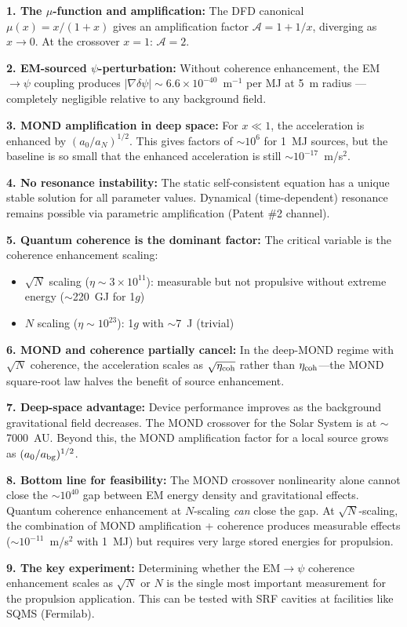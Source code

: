 \documentclass[aps,prd,twocolumn,superscriptaddress,nofootinbib]{revtex4-2}
\newcommand{\ee}[1]{\times 10^{#1}}
\begin{document}
\begin{tcolorbox}[colback=blue!5!white, colframe=blue!75!black,
title=Agent 11: Principal Findings]

\textbf{1. The $\mu$-function and amplification:}
The DFD canonical $\mu(x) = x/(1+x)$ gives an amplification factor
$\mathcal{A} = 1 + 1/x$, diverging as $x \to 0$.  At the crossover
$x = 1$: $\mathcal{A} = 2$.

\textbf{2. EM-sourced $\psi$-perturbation:}
Without coherence enhancement, the EM$\to\psi$ coupling produces
$|\nabla\delta\psi| \sim 6.6\ee{-40}$~m$^{-1}$ per MJ at 5~m radius
---completely negligible relative to any background field.

\textbf{3. MOND amplification in deep space:}
For $x \ll 1$, the acceleration is enhanced by $(a_0/a_N)^{1/2}$.
This gives factors of $\sim 10^6$ for 1~MJ sources, but the baseline
is so small that the enhanced acceleration is still $\sim 10^{-17}$~m/s$^2$.

\textbf{4. No resonance instability:}
The static self-consistent equation has a unique stable solution for all
parameter values.  Dynamical (time-dependent) resonance remains possible
via parametric amplification (Patent \#2 channel).

\textbf{5. Quantum coherence is the dominant factor:}
The critical variable is the coherence enhancement scaling:
\begin{itemize}[nosep]
\item $\sqrt{N}$ scaling ($\eta \sim 3\ee{11}$): measurable but not
propulsive without extreme energy ($\sim$220~GJ for 1$g$)
\item $N$ scaling ($\eta \sim 10^{23}$): 1$g$ with $\sim$7~J (trivial)
\end{itemize}

\textbf{6. MOND and coherence partially cancel:}
In the deep-MOND regime with $\sqrt{N}$ coherence, the acceleration
scales as $\sqrt{\eta_{\rm coh}}$ rather than $\eta_{\rm coh}$---the
MOND square-root law halves the benefit of source enhancement.

\textbf{7. Deep-space advantage:}
Device performance improves as the background gravitational field
decreases.  The MOND crossover for the Solar System is at $\sim$7000~AU.
Beyond this, the MOND amplification factor for a local source grows as
$(a_0/a_{\rm bg})^{1/2}$.

\textbf{8. Bottom line for feasibility:}
The MOND crossover nonlinearity alone cannot close the $\sim 10^{40}$
gap between EM energy density and gravitational effects.  Quantum
coherence enhancement at $N$-scaling \emph{can} close the gap.  At
$\sqrt{N}$-scaling, the combination of MOND amplification + coherence
produces measurable effects ($\sim 10^{-11}$~m/s$^2$ with 1~MJ) but
requires very large stored energies for propulsion.

\textbf{9. The key experiment:}
Determining whether the EM$\to\psi$ coherence enhancement scales as
$\sqrt{N}$ or $N$ is the single most important measurement for the
propulsion application.  This can be tested with SRF cavities at
facilities like SQMS (Fermilab).

\end{tcolorbox}
\end{document}
